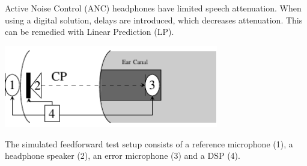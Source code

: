 Active Noise Control (ANC) headphones have limited speech attenuation.
When using a digital solution, delays are introduced, which decreases attenuation. This can be remedied with Linear Prediction (LP).
\vspace{-2mm}
\begin{center}
	\includegraphics[width=0.7\textwidth]{figures/BasicOverviewZoomed.pdf}
\end{center}
\vspace{-2mm}
The simulated feedforward test setup consists of a reference microphone (1), a headphone speaker (2), an error microphone (3) and a DSP (4).



 











